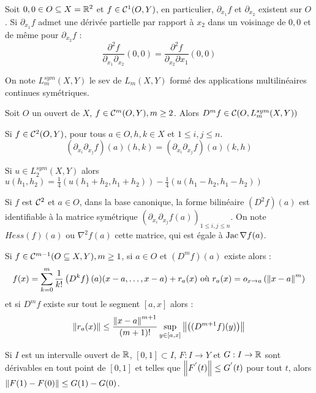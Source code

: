 \documentclass{cours}
\begin{document}
\begin{lemma}
    Soit $0, 0 \in O \subseteq X = \mathbb{R}^{2}$ et $f \in \mathcal{C}^{1}(O, Y)$, en particulier, $\partial_{x_{1}}f $ et $\partial_{x_{2}}$ existent sur $O$. Si $\partial_{x_{1}}f$ admet une dérivée partielle par rapport à $x_{2}$ dans un voisinage de $0, 0$ et de même pour $\partial_{x_{2}}f$ : 
    \[
        \frac{\partial^{2}f}{\partial_{x_{1}}\partial_{x_{2}}}(0, 0) = \frac{\partial^{2}f}{\partial_{x_{2}}\partial{x_{1}}}(0, 0)
    \]
\end{lemma}

\begin{definition}
    On note $L_{m}^{sym}(X, Y)$ le sev de $L_{m}(X, Y)$ formé des applications multilinéaires continues symétriques.
\end{definition}

\begin{theorem}
    Soit $O$ un ouvert de $X$, $f \in \mathcal{C}^{m}(O, Y), m\geq 2$. Alors $D^{m}f \in \mathcal{C}(O, L_{m}^{sym}(X, Y))$
\end{theorem}

\begin{corollary}
    Si $f \in \mathcal{C}^{2}(O, Y)$, pour tous $a \in O, h, k \in X$ et $1 \leq i,j \leq n$.
    \[
        (\partial_{x_{i}}\partial_{x_{j}}f)(a)(h, k) = (\partial_{x_{i}}\partial_{x_{j}}f)(a)(k, h)
    \]
\end{corollary}

\begin{remark}
    Si $u \in L_{2}^{sym}(X, Y)$ alors $u(h_{1}, h_{2}) = \frac{1}{4}(u(h_{1} + h_{2}, h_{1} + h_{2})) - \frac{1}{4}(u(h_{1} - h_{2}, h_{1} - h_{2}))$
\end{remark}

\begin{definition}
    Si $f$ est $\mathcal{C}^{2}$ et $a \in O$, dans la base canonique, la forme bilinéaire $(D^{2}f)(a)$ est identifiable à la matrice symétrique $\left(\partial_{x_{i}}\partial_{x_{j}}f(a)\right)_{1 \leq i, j \leq n}$. On note $Hess(f)(a)$ ou $\nabla^{2}f(a)$ cette matrice, qui est égale à $\operatorname{Jac}\nabla f(a)$.
\end{definition}
\begin{theorem}
    Si $f \in \mathcal{C}^{m - 1}(O \subseteq X, Y), m\geq 1$, si $a \in O$ et $\left(D^{m}f\right)(a)$ existe alors : 
    \[
        f(x) = \sum_{k = 0}^{m}\frac{1}{k!}\left(D^{k}f\right)(a)(x - a, \ldots, x - a) + r_{a}(x) \text{ où } r_{a}(x) = o_{x \rightarrow a}\left(\left\lVert x - a \right\rVert^{m}\right)
    \]
    et si $D^{m}f$ existe sur tout le segment $\left[a, x\right]$ alors : 
    \[
        \left\lVert r_{a}(x) \right\rVert \leq \frac{\left\lVert x - a \right\rVert^{m + 1}}{(m + 1)!}\sup_{y \in \left[a, x\right]}\left\lVert \left((D^{m + 1}f)(y)\right) \right\rVert
    \]
\end{theorem}
\begin{lemma}
    Si $I$ est un intervalle ouvert de $\mathbb{R}$, $\left[0, 1\right] \subset I$, $F : I \rightarrow Y$ et $G : I \rightarrow \mathbb{R}$ sont dérivables en tout point de $\left[0, 1\right]$ et telles que $\left\lVert F^{'}(t) \right\rVert \leq G^{'}(t)$ pour tout $t$, alors $\left\lVert F(1) - F(0) \right\rVert \leq G(1) - G(0)$.
\end{lemma}
\end{document}
